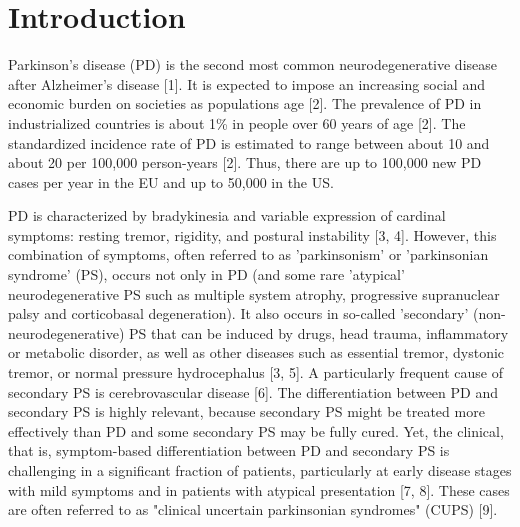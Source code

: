 \section{Introduction}
\label{sec:intro}


Parkinson's disease (PD) is the second most common neurodegenerative disease after Alzheimer's disease [1]. 
It is expected to impose an increasing social and economic burden on societies as populations age [2]. 
The prevalence of PD in industrialized countries is about 1\% in people over 60 years of age [2]. 
The standardized incidence rate of PD is estimated to range between about 10 and about 20 per 100,000 person-years [2]. 
Thus, there are up to 100,000 new PD cases per year in the EU and up to 50,000 in the US.

PD is characterized by bradykinesia and variable expression of cardinal symptoms: resting tremor, rigidity, and postural instability [3, 4]. 
However, this combination of symptoms, often referred to as 'parkinsonism' or 'parkinsonian syndrome' (PS), 
occurs not only in PD (and some rare 'atypical' neurodegenerative PS such as multiple system atrophy, progressive 
supranuclear palsy and corticobasal degeneration). 
It also occurs in so-called 'secondary' (non-neurodegenerative) PS that can be induced by drugs, head trauma, 
inflammatory or metabolic disorder, as well as other diseases such as essential tremor, dystonic tremor, or normal pressure hydrocephalus [3, 5]. 
A particularly frequent cause of secondary PS is cerebrovascular disease [6]. 
The differentiation between PD and secondary PS is highly relevant, 
because secondary PS might be treated more effectively than PD and some secondary PS may be fully cured.
Yet, the clinical, that is, symptom-based differentiation between PD and secondary PS is challenging in a significant fraction of patients, 
particularly at early disease stages with mild symptoms and in patients with atypical presentation [7, 8]. 
These cases are often referred to as "clinical uncertain parkinsonian syndromes" (CUPS) [9].

